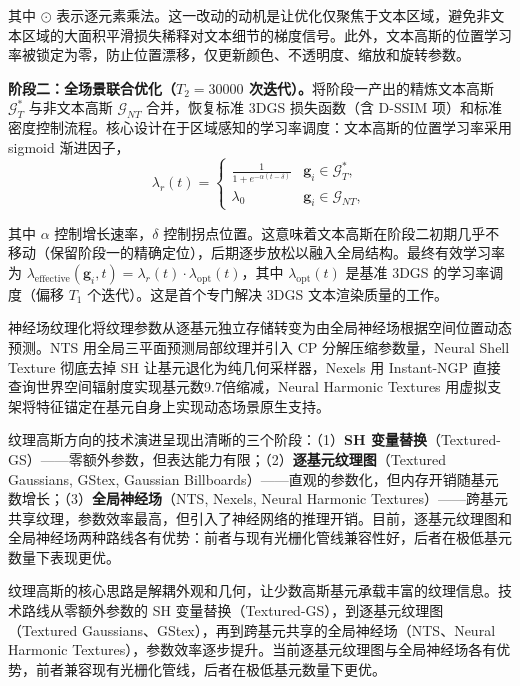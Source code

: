 其中 $\odot$ 表示逐元素乘法。这一改动的动机是让优化仅聚焦于文本区域，避免非文本区域的大面积平滑损失稀释对文本细节的梯度信号。此外，文本高斯的位置学习率被锁定为零，防止位置漂移，仅更新颜色、不透明度、缩放和旋转参数。

\textbf{阶段二：全场景联合优化（$T_2 = 30000$ 次迭代）。}将阶段一产出的精炼文本高斯 $\mathcal{G}_T^*$ 与非文本高斯 $\mathcal{G}_{NT}$ 合并，恢复标准 3DGS 损失函数（含 D-SSIM 项）和标准密度控制流程。核心设计在于区域感知的学习率调度：文本高斯的位置学习率采用 sigmoid 渐进因子，
\begin{equation}
\lambda_r(t) = \begin{cases} \frac{1}{1 + e^{-\alpha(t - \delta)}} & \mathbf{g}_i \in \mathcal{G}_T^*, \\ \lambda_0 & \mathbf{g}_i \in \mathcal{G}_{NT}, \end{cases}
\end{equation}

其中 $\alpha$ 控制增长速率，$\delta$ 控制拐点位置。这意味着文本高斯在阶段二初期几乎不移动（保留阶段一的精确定位），后期逐步放松以融入全局结构。最终有效学习率为 $\lambda_{\text{effective}}(\mathbf{g}_i, t) = \lambda_r(t) \cdot \lambda_{\text{opt}}(t)$，其中 $\lambda_{\text{opt}}(t)$ 是基准 3DGS 的学习率调度（偏移 $T_1$ 个迭代）。这是首个专门解决 3DGS 文本渲染质量的工作。

\begin{takeaway}
神经场纹理化将纹理参数从逐基元独立存储转变为由全局神经场根据空间位置动态预测。NTS 用全局三平面预测局部纹理并引入 CP 分解压缩参数量，Neural Shell Texture 彻底去掉 SH 让基元退化为纯几何采样器，Nexels 用 Instant-NGP 直接查询世界空间辐射度实现基元数9.7倍缩减，Neural Harmonic Textures 用虚拟支架将特征锚定在基元自身上实现动态场景原生支持。
\end{takeaway}


纹理高斯方向的技术演进呈现出清晰的三个阶段：（1）\textbf{SH 变量替换}（Textured-GS）——零额外参数，但表达能力有限；（2）\textbf{逐基元纹理图}（Textured Gaussians, GStex, Gaussian Billboards）——直观的参数化，但内存开销随基元数增长；（3）\textbf{全局神经场}（NTS, Nexels, Neural Harmonic Textures）——跨基元共享纹理，参数效率最高，但引入了神经网络的推理开销。目前，逐基元纹理图和全局神经场两种路线各有优势：前者与现有光栅化管线兼容性好，后者在极低基元数量下表现更优。

\begin{takeaway}
纹理高斯的核心思路是解耦外观和几何，让少数高斯基元承载丰富的纹理信息。技术路线从零额外参数的 SH 变量替换（Textured-GS），到逐基元纹理图（Textured Gaussians、GStex），再到跨基元共享的全局神经场（NTS、Neural Harmonic Textures），参数效率逐步提升。当前逐基元纹理图与全局神经场各有优势，前者兼容现有光栅化管线，后者在极低基元数量下更优。
\end{takeaway}

